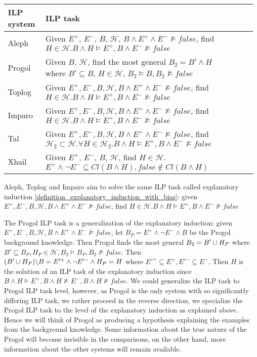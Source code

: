 \begin{center}
    \begin{tabular}{ | l | p{15cm} | l | p{5cm} |}
    \hline
    ILP system & ILP task\\ \hline
    Aleph & Given $E^{+}$, $E^{-}$, $B$, $\mathcal{H}$, $B \land E^{+} \land E^{-} \not\models false$, find $H \in \mathcal{H}. B \land H \models E^{+}, B \land E^{-} \not\models false$\\ \hline
    Progol & Given $B$, $\mathcal{H}$, find the most general $B_2 = B' \land H$ where $B' \subseteq B$, $H \in \mathcal{H}$, $B_2 \models B, B_2 \not\models false$\\ \hline
    Toplog & Given $E^{+}, E^{-}, B, \mathcal{H}, B \land E^{+} \land E^{-} \not\models false$, find $H \in \mathcal{H}. B \land H \models E^{+}, B \land E^{-} \not\models false$ \\ \hline
    Imparo & Given $E^{+}, E^{-}, B, \mathcal{H}, B \land E^{+} \land E^{-} \not\models false$, find $H \in \mathcal{H}. B \land H \models E^{+}, B \land E^{-} \not\models false$ \\ \hline
    Tal & Given $E^{+}, E^{-}, B, \mathcal{H}, B \land E^{+} \land E^{-} \not\models false$, find $\mathcal{H}_2 \subset \mathcal{H}. \forall H \in \mathcal{H}_2. B \land H \models E^{+}, B \land E^{-} \not\models false$ \\ \hline
    Xhail & Given $E^{+}$, $E^{-}$, $B$, $\mathcal{H}$, find $H \in \mathcal{H}$. $E^{+} \land \neg E^{-} \subseteq Cl(B \land H), false \not\in Cl(B \land H)$\\ \hline
    \end{tabular}
\end{center}

Aleph, Toplog and Imparo aim to solve the same ILP task called explanatory induction \ref{definition_explanatory_induction_with_bias}:
given $E^{+}, E^{-}, B, \mathcal{H}, B \land E^{+} \land E^{-} \not\models false$, find $H \in \mathcal{H}. B \land H \models E^{+}, B \land E^{-} \not\models false$

The Progol ILP task is a generalization of the explanatory induction: given $E^{+}, E^{-}, B, \mathcal{H}, B \land E^{+} \land E^{-} \not\models false$,
let $B_P=E^{+} \land \neg E^{-} \land B$ be the Progol background knowledge. Then Progol finds the most general $B_2 = B' \cup H_P$ where $B' \subseteq B_P, H_P \in \mathcal{H}, B_2 \models B_P, B_2 \not\models false$.
Then $(B' \cup H_P) \backslash B=E'^{+} \land \neg E'^- \land H_P = H$ where $E'^+ \subseteq E^+, E'^- \subseteq E^-$. Then $H$ is the solution of an ILP task of the explanatory induction since $B \land H \models E^{+}, B \land H \not\models E^{-}, B \land H \not\models false$. We could generalize the ILP task to Progol ILP task level, however, as Progol is the only system with so significantly differing ILP task, we rather proceed in the reverse direction, we specialize the Progol ILP task to the level of the explanatory induction as explained above. Hence we will think of Progol as producing a hypothesis explaining the examples from the background knowledge. Some information about the true nature of the Progol will become invisible in the comparisons, on the other hand, more information about the other systems will remain available.

